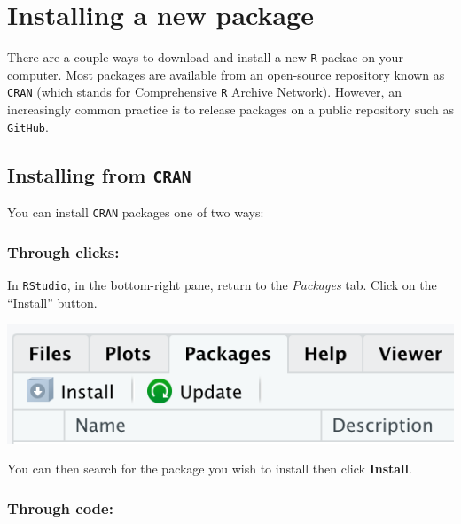 \documentclass[
]{book}
\begin{document}
\hypertarget{installing-a-new-package}{%
\section*{Installing a new package}\label{installing-a-new-package}}

There are a couple ways to download and install a new \texttt{R} packae on your computer. Most packages are available from an open-source repository known as \texttt{CRAN} (which stands for Comprehensive \texttt{R} Archive Network). However, an increasingly common practice is to release packages on a public repository such as \texttt{GitHub}.

\hypertarget{installing-from-cran}{%
\subsection*{\texorpdfstring{Installing from \texttt{CRAN}}{Installing from CRAN}}\label{installing-from-cran}}

You can install \texttt{CRAN} packages one of two ways:

\hypertarget{through-clicks}{%
\subsubsection*{Through clicks:}\label{through-clicks}}

In \texttt{RStudio}, in the bottom-right pane, return to the \emph{Packages} tab. Click on the ``Install'' button.

\includegraphics{img/rstudio_install-package.png}

You can then search for the package you wish to install then click \textbf{Install}.

\hypertarget{through-code}{%
\subsubsection*{Through code:}\label{through-code}}
\end{document}
